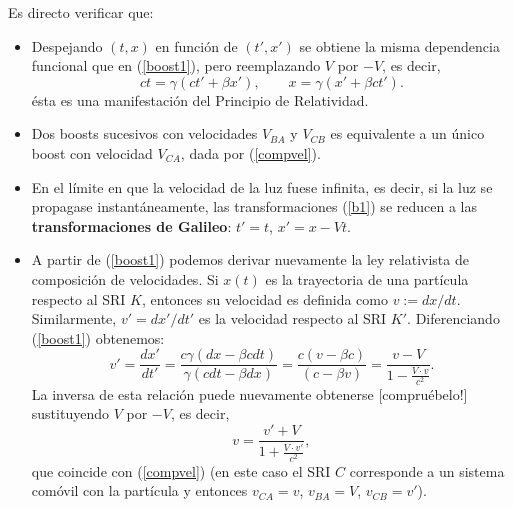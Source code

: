 Es directo verificar que:
\begin{itemize}
\item Despejando $(t,x)$ en función de $(t',x')$ se obtiene la misma
dependencia funcional que en (\ref{boost1}), pero reemplazando $V$ por $-V$, es decir,
\begin{equation}
\boxed{ct=\gamma (ct'+\beta x'), \qquad x=\gamma(x'+\beta ct').} \label{boost2}
\end{equation}
ésta es una manifestación del Principio de Relatividad.

\item Dos boosts sucesivos con velocidades $V_{BA}$ y $V_{CB}$ es
equivalente a un único boost con velocidad $V_{CA}$, dada por (\ref{compvel}).

\item En el límite en que la velocidad de la luz fuese infinita, es decir, si la luz se propagase instantáneamente, las transformaciones (\ref{b1}) se reducen a las \textbf{transformaciones de Galileo}: $t'=t$, $x'=x-Vt$.

\item A partir de (\ref{boost1}) podemos derivar nuevamente la ley relativista de composición de velocidades. Si $x(t)$ es la trayectoria de una partícula respecto al SRI $K$, entonces su velocidad es definida como $v:=dx/dt$. Similarmente, $v'=dx'/dt'$ es la velocidad respecto al SRI $K'$. Diferenciando (\ref{boost1})  obtenemos:
\begin{equation}
 v'=\frac{dx'}{dt'}=\frac{c\gamma(dx-\beta c dt)}{\gamma(cdt-\beta dx)}=\frac{c(v-\beta c)}{(c-\beta v)}=\frac{v-V}{1-\frac{V\cdot v}{c^2}}.
\end{equation}
La inversa de esta relación puede nuevamente obtenerse [compruébelo!] sustituyendo $V$ por $-V$, es decir,
\begin{equation}
v=\frac{v'+V}{1+\frac{V\cdot v'}{c^2}},
\end{equation}
que coincide con (\ref{compvel}) (en este caso el SRI $C$ corresponde a un sistema comóvil con la partícula y entonces $v_{CA}=v$, $v_{BA}=V$, $v_{CB}=v'$).


\end{itemize}
